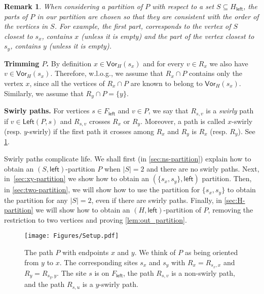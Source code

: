 \documentclass{article}
\newcommand{\Left}{\mathsf{Left}}
\newcommand{\leftside}{\mathsf{left}}
\newcommand{\Vor}{\textsf{Vor}}
\newtheorem{remark}{Remark}
\begin{document}
\begin{remark}\label{remark:order}
When considering a partition of $P$ with respect to a set $S\subseteq H_{\leftside}$, the parts of $P$ in our partition are chosen so that they are consistent with the order of the vertices in $S$.
For example, the first part, corresponds to the vertex of $S$ closest to $s_x$,  contains $x$ (unless it is empty) and the part of the vertex closest to $s_y$, contains $y$ (unless it is empty).
\end{remark}







\noindent
{\bf Trimming $P$.}
By definition $x\in \Vor_H(s_x)$ and for every $v\in R_x$ we also have $v\in \Vor_H(s_x)$.
Therefore, w.l.o.g., we assume that $R_x\cap P$ contains only the vertex $x$, since all the vertices of $R_x\cap P$ are known to belong to $\Vor_H(s_x)$.
Similarly, we assume that $R_y\cap P= \{y\}$.



\medskip
\noindent
{\bf Swirly paths.}
For vertices $s\in F_{\leftside}$ and $v\in P$, we say that $R_{s,v}$ is a {\em swirly} path if $v\in\Left(P,s)$ and $R_{s,v}$ crosses $R_x$ or $R_y$.
Moreover, a path is called $x$-swirly (resp. $y$-swirly) if the first path it crosses among $R_x$ and $R_y$ is $R_x$ (resp. $R_y$). See \cref{fig:setup}.

Swirly paths complicate life.
We shall first (in \cref{sec:ns-partition}) explain how to obtain an $(S,\leftside)$-partition $P$ when $|S|=2$ and there are no swirly paths.
Next, in~\cref{sec:xy-partition} we show how to obtain an $(\{s_x,s_y\},\leftside)$ partition.
Then, in \cref{sec:two-partition}, we will show how to use the partition for $\{s_x,s_y\}$ to obtain  the partition for any $|S|=2$, even if there are swirly paths.
Finally, in \cref{sec:H-partition} we will show how to obtain an $(H,\leftside)$-partition of $P$, removing the restriction to two vertices and proving \cref{lem:out_partition}.


\begin{figure}[htb]
\begin{minipage}[c]{0.25\textwidth}
    \texttt{[image: Figures/Setup.pdf]}
  \end{minipage}\hfill
  \begin{minipage}[t]{0.7\textwidth}
    \caption{The path $P$ with endpoints $x$ and $y$. We think of $P$ as being oriented from $y$ to $x$. The corresponding sites $s_x$ and $s_y$ with $R_x=R_{s_x,x}$ and $R_y=R_{s_y,y}$.
   The site $s$ is on $F_{\leftside}$, the path $R_{s,v}$ is a non-swirly path, and the path $R_{s,u}$ is a $y$-swirly path. \label{fig:setup}}
  \end{minipage}
\end{figure}
\end{document}
